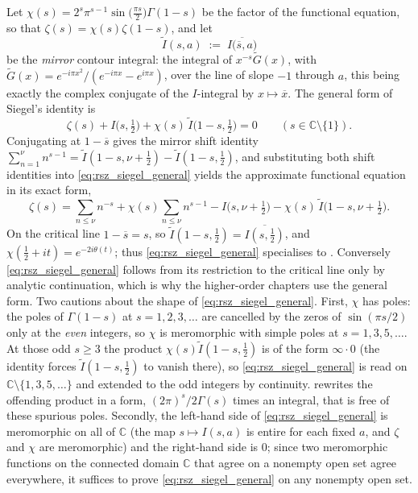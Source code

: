 \begin{remark}
\label{rem:rsz_general}
Let $\chi(s)=2^{s}\pi^{s-1}\sin\bigl(\tfrac{\pi s}2\bigr)\Gamma(1-s)$ be the factor of the
functional equation, so that $\zeta(s)=\chi(s)\zeta(1-s)$, and let
\[
  \widetilde I(s,a)\;:=\;\overline{I\bigl(\overline{s},a\bigr)}
\]
be the \emph{mirror} contour integral: the integral of $x^{-s}\widetilde G(x)$, with
$\widetilde G(x)=e^{-i\pi x^{2}}/(e^{-i\pi x}-e^{i\pi x})$, over the line of slope $-1$
through $a$, this being exactly the complex conjugate of the $I$-integral by
$x\mapsto\overline x$.  The general form of Siegel's identity is
\begin{equation}
  \zeta(s)+I\bigl(s,\tfrac12\bigr)+\chi(s)\,\widetilde I\bigl(1-s,\tfrac12\bigr)=0
  \qquad(s\in\mathbb{C}\setminus\{1\}).
  \label{eq:rsz_siegel_general}
\end{equation}
Conjugating  at $1-\overline s$ gives the mirror shift identity
$\sum_{n=1}^{\nu}n^{s-1}=\widetilde I(1-s,\nu+\tfrac12)-\widetilde I(1-s,\tfrac12)$, and
substituting both shift identities into \eqref{eq:rsz_siegel_general} yields the
approximate functional equation in its exact form,
\[
  \zeta(s)=\sum_{n\le\nu}n^{-s}+\chi(s)\sum_{n\le\nu}n^{s-1}
     -I\bigl(s,\nu+\tfrac12\bigr)-\chi(s)\,\widetilde I\bigl(1-s,\nu+\tfrac12\bigr).
\]
On the critical line $1-\overline s=s$, so $\widetilde I(1-s,\tfrac12)=\overline{I(s,\tfrac12)}$,
and $\chi(\tfrac12+it)=e^{-2i\theta(t)}$; thus \eqref{eq:rsz_siegel_general} specialises
to .  Conversely \eqref{eq:rsz_siegel_general} follows from its
restriction to the critical line only by analytic continuation, which is why the
higher-order chapters use the general form.
Two cautions about the shape of \eqref{eq:rsz_siegel_general}.  First, $\chi$ has poles:
the poles of $\Gamma(1-s)$ at $s=1,2,3,\dots$ are cancelled by the zeros of
$\sin(\pi s/2)$ only at the \emph{even} integers, so $\chi$ is meromorphic with simple
poles at $s=1,3,5,\dots$.  At those odd $s\ge3$ the product
$\chi(s)\widetilde I(1-s,\tfrac12)$ is of the form $\infty\cdot0$ (the identity forces
$\widetilde I(1-s,\tfrac12)$ to vanish there), so \eqref{eq:rsz_siegel_general} is
read on $\mathbb{C}\setminus\{1,3,5,\dots\}$ and extended to the odd integers by
continuity.   rewrites the offending product in a form,
$(2\pi)^{s}/2\Gamma(s)$ times an integral, that is free of these spurious poles.  Secondly,
the left-hand side of
\eqref{eq:rsz_siegel_general} is meromorphic on all of $\mathbb{C}$ (the
map $s\mapsto I(s,a)$ is entire for each fixed $a$, and $\zeta$ and $\chi$ are
meromorphic) and the right-hand side is $0$; since two meromorphic functions on the
connected domain $\mathbb{C}$ that agree on a nonempty open set agree everywhere, it
suffices to prove \eqref{eq:rsz_siegel_general} on any nonempty open set.
\end{remark}

